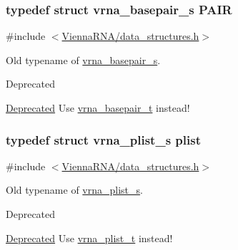 \subsubsection[{P\+A\+I\+R}]{\setlength{\rightskip}{0pt plus 5cm}typedef struct {\bf vrna\+\_\+basepair\+\_\+s} {\bf P\+A\+I\+R}}\label{group__data__structures_ga4381025ffbd692e54189b2c679c79c99}


{\ttfamily \#include $<$\hyperlink{data__structures_8h}{Vienna\+R\+N\+A/data\+\_\+structures.\+h}$>$}



Old typename of \hyperlink{group__data__structures_structvrna__basepair__s}{vrna\+\_\+basepair\+\_\+s}. 

\begin{DoxyRefDesc}{Deprecated}
\item[\hyperlink{deprecated__deprecated000046}{Deprecated}]Use \hyperlink{group__data__structures_gac8c5669d3fb813cacf506489689305ce}{vrna\+\_\+basepair\+\_\+t} instead! \end{DoxyRefDesc}
\hypertarget{group__data__structures_gab1d8894b43aa84cbc50b862a73785fbc}{}
\subsubsection[{plist}]{\setlength{\rightskip}{0pt plus 5cm}typedef struct {\bf vrna\+\_\+plist\+\_\+s} {\bf plist}}\label{group__data__structures_gab1d8894b43aa84cbc50b862a73785fbc}


{\ttfamily \#include $<$\hyperlink{data__structures_8h}{Vienna\+R\+N\+A/data\+\_\+structures.\+h}$>$}



Old typename of \hyperlink{group__data__structures_structvrna__plist__s}{vrna\+\_\+plist\+\_\+s}. 

\begin{DoxyRefDesc}{Deprecated}
\item[\hyperlink{deprecated__deprecated000047}{Deprecated}]Use \hyperlink{group__data__structures_ga8e4eb5e1bfc95776559575beb359af87}{vrna\+\_\+plist\+\_\+t} instead! \end{DoxyRefDesc}
\hypertarget{group__data__structures_ga8412f116a2eb07b59ade9e14ca7c5ef1}{}
